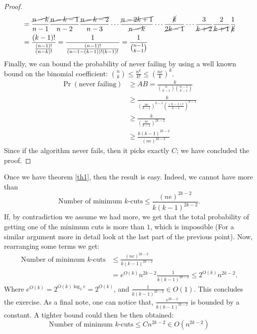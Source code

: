 \documentclass[11pt]{article}
\begin{document}
\begin{enumerate}
\begin{proof}
\begin{align*}
            &= \frac{\cancel{n-k}}{n-1}\frac{\cancel{n-k-1}}{n-2}\frac{\cancel{n-k-2}}{n-3}\cdots\frac{\cancel{n-2k+1}}{\cancel{n-k}}\cdots \frac{\cancel{k}}{\cancel{2k-1}}\cdots\frac{3}{\cancel{k+2}}\frac{2}{\cancel{k+1}}\frac{1}{\cancel{k}}\\
            &=\frac{(k-1)!}{\frac{(n-1)!}{(n-k)!}} = \frac{1}{\frac{(n-1)!}{(n-1-(k-1))!(k-1)!}} = \frac{1}{\binom{n-1}{k-1}}
        \end{align*}
        Finally, we can bound the probability of never failing by using a well known bound on the binomial coefficient: $\binom{n}{k}\leq \frac{n^k}{k!} \leq \left(\frac{ne}{k}\right)^k$.
        \begin{align*}
            \Pr\left(\text{never failing}\right) &\geq AB = \frac{k}{\binom{n}{k-1}\binom{n-1}{k-1}}\\
            & \geq \frac{k}{\left(\frac{ne}{k-1}\right)^{k-1}\left(\frac{(n-1)e}{k-1}\right)^{k-1}}\\
            & \geq \frac{k}{\left(\frac{ne}{k-1}\right)^{2k-2}}\\
            & \geq \frac{k(k-1)^{2k-2}}{(ne)^{2k-2}}
        \end{align*}
        Since if the algorithm never fails, then it picks exactly $C$; we have concluded the proof. 
    \end{proof}
    Once we have theorem \ref{th1}, then the result is easy. Indeed, we cannot have more than
    \begin{equation*}
        \text{Number of minimum $k$-cuts} \leq \frac{(ne)^{2k-2}}{k(k-1)^{2k-2}}.
    \end{equation*}
    If, by contradiction we assume we had more, we get that the total probability of getting one of the minimum cuts is more than $1$, which is impossible (For a similar argument more in detail look at the last part of the previous point). Now, rearranging some terms we get:
    \begin{align*}
        \text{Number of minimum $k$-cuts} &\leq \frac{(ne)^{2k-2}}{k(k-1)^{2k-2}}\\
        & = e^{O(k)}n^{2k-2}\frac{1}{k(k-1)^{2k-2}} \leq 2^{O(k)}n^{2k-2}.
    \end{align*}
    Where $e^{O(k)} = 2^{O(k)\log_2e} = 2^{O(k)}$, and $\frac{1}{k(k-1)^{2k-2}} \in O(1)$. This concludes the exercise. As a final note, one can notice that, $\frac{e^{2k-2}}{k(k-1)^{2k-2}}$ is bounded by a constant. A tighter bound could then be then obtained:
    \begin{equation*}
        \text{Number of minimum $k$-cuts} \leq C n^{2k-2} \in O(n^{2k-2})
    \end{equation*} 
\end{enumerate}
\end{document}
